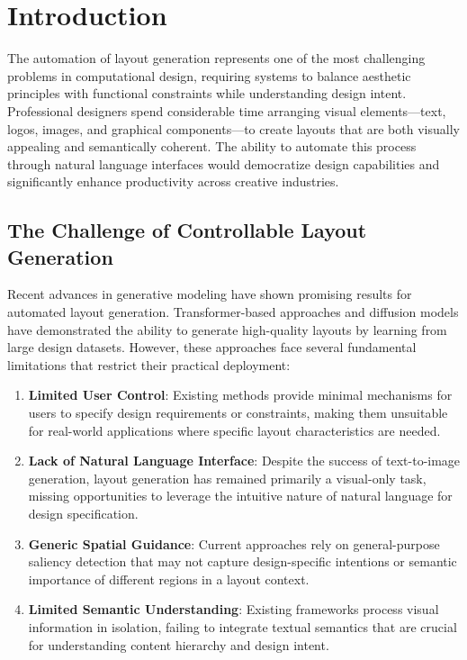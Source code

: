 \documentclass[journal,article,submit,pdftex,moreauthors]{Definitions/mdpi}
\begin{document}


\section{Introduction}

The automation of layout generation represents one of the most challenging problems in computational design, requiring systems to balance aesthetic principles with functional constraints while understanding design intent. Professional designers spend considerable time arranging visual elements—text, logos, images, and graphical components—to create layouts that are both visually appealing and semantically coherent. The ability to automate this process through natural language interfaces would democratize design capabilities and significantly enhance productivity across creative industries.

\subsection{The Challenge of Controllable Layout Generation}

Recent advances in generative modeling have shown promising results for automated layout generation. Transformer-based approaches and diffusion models have demonstrated the ability to generate high-quality layouts by learning from large design datasets. However, these approaches face several fundamental limitations that restrict their practical deployment:

\begin{enumerate}
\item \textbf{Limited User Control}: Existing methods provide minimal mechanisms for users to specify design requirements or constraints, making them unsuitable for real-world applications where specific layout characteristics are needed.

\item \textbf{Lack of Natural Language Interface}: Despite the success of text-to-image generation, layout generation has remained primarily a visual-only task, missing opportunities to leverage the intuitive nature of natural language for design specification.

\item \textbf{Generic Spatial Guidance}: Current approaches rely on general-purpose saliency detection that may not capture design-specific intentions or semantic importance of different regions in a layout context.

\item \textbf{Limited Semantic Understanding}: Existing frameworks process visual information in isolation, failing to integrate textual semantics that are crucial for understanding content hierarchy and design intent.
\end{enumerate}
\end{document}
